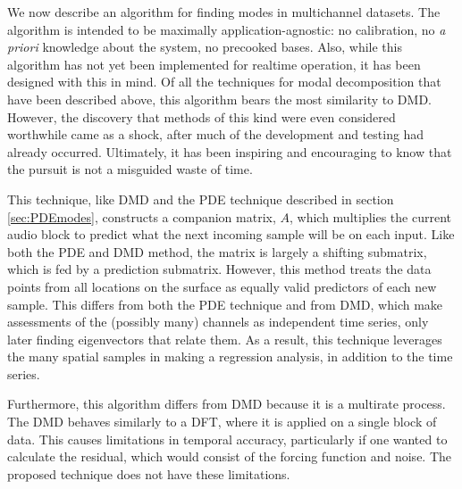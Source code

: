 \documentclass[a4paper,10pt]{report}
\numberwithin{equation}{section}
\begin{document}
We now describe an algorithm for finding modes in multichannel datasets. The algorithm is intended to be maximally application-agnostic: no calibration, no \emph{a priori} knowledge about the system, no precooked bases. Also, while this algorithm has not yet been implemented for realtime operation, it has been designed with this in mind. Of all the techniques for modal decomposition that have been described above, this algorithm bears the most similarity to DMD. However, the discovery that methods of this kind were even considered worthwhile came as a shock, after much of the development and testing had already occurred. Ultimately, it has been inspiring and encouraging to know that the pursuit is not a misguided waste of time.

This technique, like DMD and the PDE technique described in section \ref{sec:PDEmodes}, constructs a companion matrix, $A$, which multiplies the current audio block to predict what the next incoming sample will be on each input. Like both the PDE and DMD method, the matrix is largely a shifting submatrix, which is fed by a prediction submatrix. However, this method treats the data points from all locations on the surface as equally valid predictors of each new sample. This differs from both the PDE technique and from DMD, which make assessments of the (possibly many) channels as independent time series, only later finding eigenvectors that relate them. As a result, this technique leverages the many spatial samples in making a regression analysis, in addition to the time series. 

Furthermore, this algorithm differs from DMD because it is a multirate process. The DMD behaves similarly to a DFT, where it is applied on a single block of data. This causes limitations in temporal accuracy, particularly if one wanted to calculate the residual, which would consist of the forcing function and noise. The proposed technique does not have these limitations.
\end{document}
